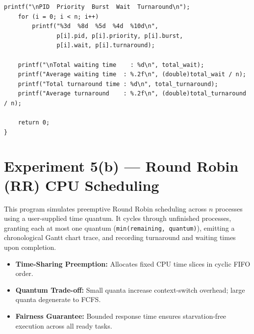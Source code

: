 \documentclass[11pt,a4paper]{article}
\newcommand{\exptheader}[3]{%
    \section[#1: #2]{#1 --- #2}%
    \label{#3}%
}
\begin{document}
\begin{lstlisting}[title={\texttt{expt\_5\_a.c}}]
    printf("\nPID  Priority  Burst  Wait  Turnaround\n");
    for (i = 0; i < n; i++)
        printf("%3d  %8d  %5d  %4d  %10d\n",
               p[i].pid, p[i].priority, p[i].burst,
               p[i].wait, p[i].turnaround);

    printf("\nTotal waiting time    : %d\n", total_wait);
    printf("Average waiting time  : %.2f\n", (double)total_wait / n);
    printf("Total turnaround time : %d\n", total_turnaround);
    printf("Average turnaround    : %.2f\n", (double)total_turnaround / n);

    return 0;
}
\end{lstlisting}

\exptheader{Experiment 5(b)}{Round Robin (RR) CPU Scheduling}{exp:5.b}

This program simulates preemptive Round Robin scheduling across $n$ processes using a user-supplied time quantum. It cycles through unfinished processes, granting each at most one quantum (\texttt{min(remaining, quantum)}), emitting a chronological Gantt chart trace, and recording turnaround and waiting times upon completion.

\begin{itemize}
    \item \textbf{Time-Sharing Preemption:} Allocates fixed CPU time slices in cyclic FIFO order.
    \item \textbf{Quantum Trade-off:} Small quanta increase context-switch overhead; large quanta degenerate to FCFS.
    \item \textbf{Fairness Guarantee:} Bounded response time ensures starvation-free execution across all ready tasks.
\end{itemize}
\end{document}
